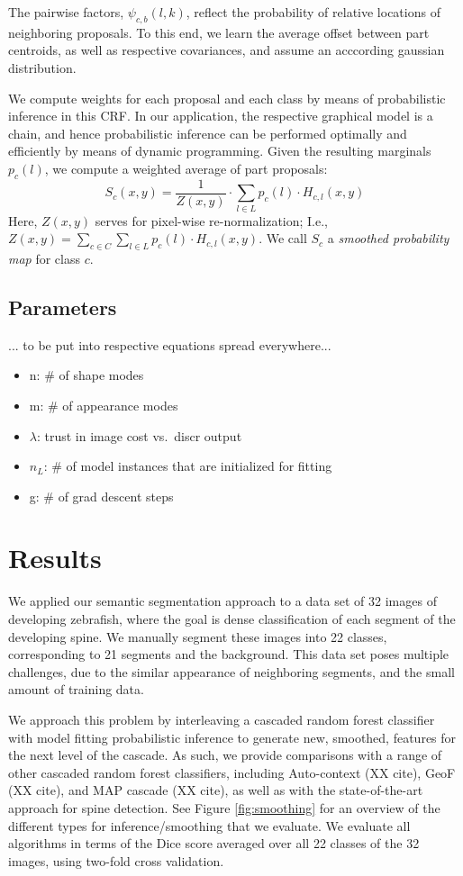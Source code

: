 \documentclass[10pt,twocolumn,letterpaper]{article}
\begin{document}
The pairwise factors, $\psi_{c,b}(l,k)$, reflect the probability of relative locations of neighboring proposals. To this end, we learn the average offset between part centroids, as well as respective covariances, and assume an acccording gaussian distribution. 

We compute weights for each proposal and each class by means of probabilistic inference in this CRF. In our application, the respective graphical model is a chain, and hence probabilistic inference can be performed optimally and efficiently by means of dynamic programming. 
%
Given the resulting marginals $p_c(l)$, we compute a weighted average of part proposals: 
\[ S_c(x,y) = \frac{1}{Z(x,y)} \cdot \sum_{l\in L} p_c(l)\cdot H_{c,l}(x,y) \]
Here, $Z(x,y)$ serves for pixel-wise re-normalization; I.e., $Z(x,y)=\sum_{c\in C}\sum_{l\in L} p_c(l)\cdot H_{c,l}(x,y)$.
%
We call $S_c$ a \emph{smoothed probability map} for class $c$. 

\subsection{Parameters}
... to be put into respective equations spread everywhere...
\begin{itemize}
\item n: \# of shape modes
\item m: \# of appearance modes
\item $\lambda$: trust in image cost vs.\ discr output
\item $n_L$: \# of model instances that are initialized for fitting
\item g: \# of grad descent steps
\end{itemize}

\section{Results}

We applied our semantic segmentation approach to a data set of 32 images of developing zebrafish, where the goal is dense classification of each segment of the developing spine.  We manually segment these images into 22 classes, corresponding to 21 segments and the background.  This data set poses multiple challenges, due to the similar appearance of neighboring segments, and the small amount of training data.

We approach this problem by interleaving a cascaded random forest classifier with model fitting probabilistic inference to generate new, smoothed, features for the next level of the cascade.  As such, we provide comparisons with a range of other cascaded random forest classifiers, including Auto-context (XX cite), GeoF (XX cite), and MAP cascade (XX cite), as well as with the state-of-the-art approach for spine detection.  See Figure \ref{fig:smoothing} for an overview of the different types for inference/smoothing that we evaluate.  We evaluate all algorithms in terms of the Dice score averaged over all 22 classes of the 32 images, using two-fold cross validation.
\end{document}
